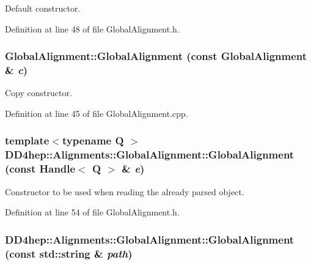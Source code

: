 Default constructor. 

Definition at line 48 of file GlobalAlignment.h.\hypertarget{class_d_d4hep_1_1_alignments_1_1_global_alignment_ac32e57cf2777dd055ace00131dcd8fce}{
\subsubsection[{GlobalAlignment}]{\setlength{\rightskip}{0pt plus 5cm}GlobalAlignment::GlobalAlignment (const {\bf GlobalAlignment} \& {\em c})}}
\label{class_d_d4hep_1_1_alignments_1_1_global_alignment_ac32e57cf2777dd055ace00131dcd8fce}


Copy constructor. 

Definition at line 45 of file GlobalAlignment.cpp.\hypertarget{class_d_d4hep_1_1_alignments_1_1_global_alignment_a0611b1ce9dcaf5629ceb43b075ee471e}{
\subsubsection[{GlobalAlignment}]{\setlength{\rightskip}{0pt plus 5cm}template$<$typename Q $>$ DD4hep::Alignments::GlobalAlignment::GlobalAlignment (const {\bf Handle}$<$ Q $>$ \& {\em e})}}
\label{class_d_d4hep_1_1_alignments_1_1_global_alignment_a0611b1ce9dcaf5629ceb43b075ee471e}


Constructor to be used when reading the already parsed object. 

Definition at line 54 of file GlobalAlignment.h.\hypertarget{class_d_d4hep_1_1_alignments_1_1_global_alignment_a28bf3bee23b8298826ffdfab0c8a94ae}{
\subsubsection[{GlobalAlignment}]{\setlength{\rightskip}{0pt plus 5cm}DD4hep::Alignments::GlobalAlignment::GlobalAlignment (const std::string \& {\em path})}}
\label{class_d_d4hep_1_1_alignments_1_1_global_alignment_a28bf3bee23b8298826ffdfab0c8a94ae}


